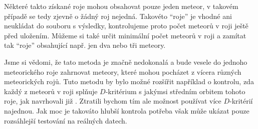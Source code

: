 \smallskip

Některé takto získané roje mohou obsahovat pouze jeden meteor, v takovém případě se tedy zjevně o žádný roj nejedná. Takovéto "`roje"' je vhodné ani neukládat do souboru s výsledky, kontrolujeme proto počet meteorů v roji ještě před uložením. Můžeme si také určit minimální počet meteorů v roji a zamítat tak "`roje"' obsahující např. jen dva nebo tři meteory.

\medskip

Jsme si vědomi, že tato metoda je značně nedokonalá a bude vesele do jednoho meteorického roje zahrnovat meteory, které mohou pocházet z vícera různých meteorických rojů. Tuto metodu by bylo možné rozšířit například o kontrolu, zda každý z meteorů v roji splňuje $D$-kritérium s jakýmsi středním orbitem tohoto roje, jak navrhovali již \citeauthor{dsh} \cite{dsh}. Ztratili bychom tím ale možnost používat více $D$-kritérií najednou. Jak moc je takováto hlubší kontrola potřeba však může ukázat pouze rozsáhlejší testování na reálných datech.